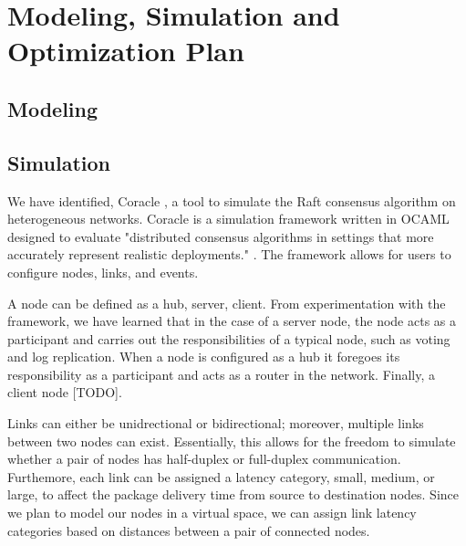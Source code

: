 \section{Modeling, Simulation and Optimization Plan}
\subsection{Modeling}



\subsection{Simulation}
We have identified, Coracle \cite{Coracle}, a tool to simulate the Raft consensus algorithm on heterogeneous networks. Coracle is a simulation framework written in OCAML designed to evaluate "distributed consensus algorithms in settings that more accurately represent realistic deployments." \cite{howardCoracleEvaluatingConsensus2015}. The framework allows for users to configure nodes, links, and events. 

A node can be defined as a hub, server, client. From experimentation with the framework, we have learned that in the case of a server node, the node acts as a participant and carries out the responsibilities of a typical node, such as voting and log replication. When a node is configured as a hub it foregoes its responsibility as a participant and acts as a router in the network. Finally, a client node [TODO].

Links can either be unidrectional or bidirectional; moreover, multiple links between two nodes can exist. Essentially, this allows for the freedom to simulate whether a pair of nodes has half-duplex or full-duplex communication. Furthemore, each link can be assigned a latency category, small, medium, or large, to affect the package delivery time from source to destination nodes. Since we plan to model our nodes in a virtual space, we can assign link latency categories based on distances between a pair of connected nodes.

